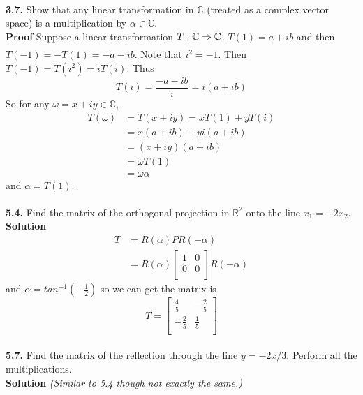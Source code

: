 \documentclass[11pt, a4paper]{article}
\begin{document}
\\
\textbf{3.7.} Show that any linear transformation in $\mathbb{C}$ (treated as a complex vector space) is a multiplication by $\alpha \in \mathbb{C}$.\\
\textbf{Proof} Suppose a linear transformation $T: \mathbb{C} \xRightarrow{} \mathbb{C}$. $T(1)=a+ib$ and then $T(-1)=-T(1)=-a-ib$. Note that $i^2=-1$. Then $T(-1)=T(i^2)=iT(i)$. Thus 
$$ T(i)=\frac{-a-ib}{i}=i(a+ib)$$
So for any $\omega=x+iy \in \mathbb{C}$,
\begin{equation*}
\begin{split}
    T(\omega) & = T(x+iy) = xT(1)+yT(i) \\
              & = x(a+ib)+yi(a+ib) \\
              & = (x+iy)(a+ib) \\
              & = \omega T(1) \\
              & = \omega \alpha
\end{split}
\end{equation*}
and $\alpha = T(1)$.
\\
\\
\textbf{5.4.} Find the matrix of the orthogonal projection in $\mathbb{R}^2$ onto the line $x_1 = -2x_2$.\\
\textbf{Solution} 
\begin{equation*}
  \begin{split}
    T &= 
    R(\alpha)PR(-\alpha) \\
    &=
    R(\alpha)
    \begin{bmatrix}
    1 & 0 \\
    0 & 0 \\
    \end{bmatrix}
    R(-\alpha)
  \end{split}
\end{equation*}
and $\alpha = tan^{-1}(-\frac{1}{2})$ so we can get the matrix is 
\begin{equation*}
    T = 
    \begin{bmatrix}
    \frac{4}{5} & -\frac{2}{5} \\
    -\frac{2}{5} & \frac{1}{5} \\
    \end{bmatrix}
\end{equation*}
\\
\textbf{5.7.} Find the matrix of the reflection through the line $y=-2x/3$. Perform all the multiplications.\\
\textbf{Solution} \emph{(Similar to 5.4 though not exactly the same.)} \\
\end{document}

